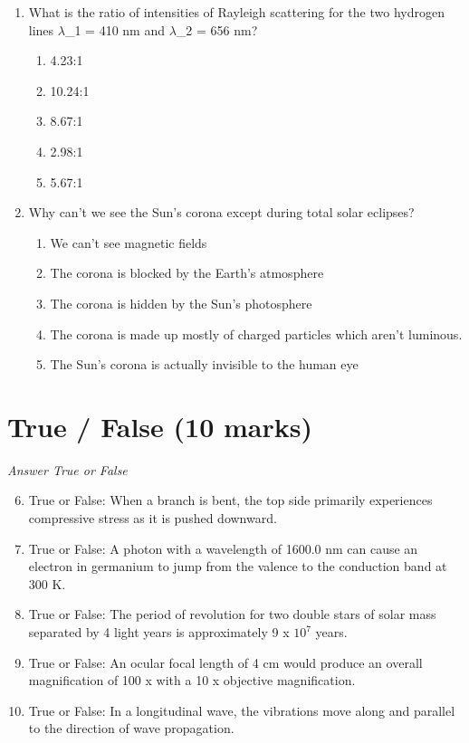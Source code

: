 \documentclass[12pt]{article}
\begin{document}
\begin{enumerate}[label=\arabic*.]
\begin{enumerate}[label=(\alph*)]
    \item 250 cm/sec and 12.5 m
    \item 200 cm/sec and 10 m
\end{enumerate}
\item What is the ratio of intensities of Rayleigh scattering for the two hydrogen lines \ensuremath{\lambda}\_1 = 410 nm and \ensuremath{\lambda}\_2 = 656 nm?
\begin{enumerate}[label=(\alph*)]
    \item 4.23:1
    \item 10.24:1
    \item 8.67:1
    \item 2.98:1
    \item 5.67:1
\end{enumerate}
\item Why can't we see the Sun's corona except during total solar eclipses?
\begin{enumerate}[label=(\alph*)]
    \item We can't see magnetic fields
    \item The corona is blocked by the Earth's atmosphere
    \item The corona is hidden by the Sun's photosphere
    \item The corona is made up mostly of charged particles which aren't luminous.
    \item The Sun's corona is actually invisible to the human eye
\end{enumerate}
\end{enumerate}

\section*{True / False (10 marks)}
\textit{Answer True or False}
\begin{enumerate}[label=\arabic*.]
\setcounter{enumi}{5}
\item True or False: When a branch is bent, the top side primarily experiences compressive stress as it is pushed downward.
\item True or False: A photon with a wavelength of 1600.0 nm can cause an electron in germanium to jump from the valence to the conduction band at 300 K.
\item True or False: The period of revolution for two double stars of solar mass separated by 4 light years is approximately 9 x $10^7$ years.
\item True or False: An ocular focal length of 4 cm would produce an overall magnification of 100 x with a 10 x objective magnification.
\item True or False: In a longitudinal wave, the vibrations move along and parallel to the direction of wave propagation.
\end{enumerate}
\end{document}
